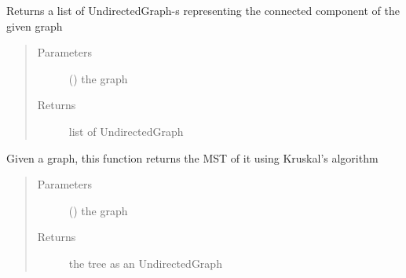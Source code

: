 \documentclass[letterpaper,10pt,english]{sphinxmanual}
\begin{document}

\begin{fulllineitems}
\label{\detokenize{UndirectedGraph:UndirectedGraph.get_connected_components}}
Returns a list of UndirectedGraph-s representing the connected component of the given graph
\begin{quote}\begin{description}
\item[{Parameters}] \leavevmode
{} ({\hyperref[\detokenize{UndirectedGraph:UndirectedGraph.UndirectedGraph}]{}}) \textendash{} the graph

\item[{Returns}] \leavevmode
list of UndirectedGraph

\end{description}\end{quote}

\end{fulllineitems}


\begin{fulllineitems}
\label{\detokenize{UndirectedGraph:UndirectedGraph.get_minimum_spanning_tree}}
Given a graph, this function returns the MST of it using Kruskal’s algorithm
\begin{quote}\begin{description}
\item[{Parameters}] \leavevmode
{} ({\hyperref[\detokenize{UndirectedGraph:UndirectedGraph.UndirectedGraph}]{}}) \textendash{} the graph

\item[{Returns}] \leavevmode
the tree as an UndirectedGraph

\end{description}\end{quote}

\end{fulllineitems}
\end{document}
